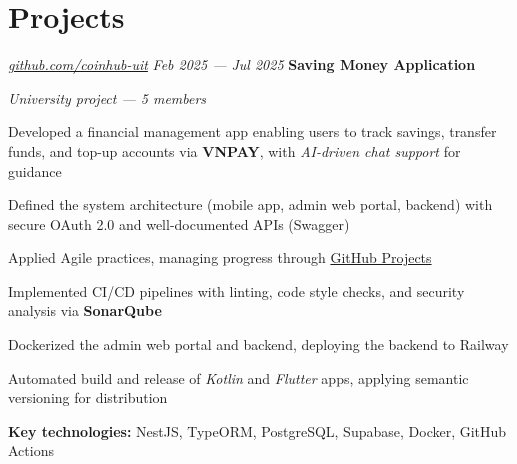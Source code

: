 \section{Projects}

\begin{twocolentry}{
		\textit{\href{https://github.com/coinhub-uit}{github.com/coinhub-uit}}
		\textit{Feb 2025 --- Jul 2025}
	}
	\textbf{Saving Money Application}

	\textit{University project — 5 members}
\end{twocolentry}

\begin{onecolentry}
	\begin{highlights}
		\item Developed a financial management app enabling users to track savings, transfer funds, and top-up
		accounts via \textbf{VNPAY}, with \textit{AI-driven chat support} for guidance
		\item Defined the system architecture (mobile app, admin web portal, backend) with secure OAuth 2.0 and
		well-documented APIs (Swagger)
		\item Applied Agile practices, managing progress through
		\href{https://github.com/orgs/coinhub-uit/projects/1}{GitHub Projects}
		\item Implemented CI/CD pipelines with linting, code style checks, and security analysis via \textbf{SonarQube}
		\item Dockerized the admin web portal and backend, deploying the backend to Railway
		\item Automated build and release of \textit{Kotlin} and \textit{Flutter} apps, applying semantic
		versioning for distribution
		\item \textbf{Key technologies:} NestJS, TypeORM, PostgreSQL, Supabase, Docker, GitHub Actions
	\end{highlights}
\end{onecolentry}
